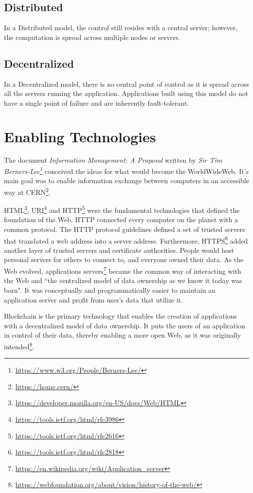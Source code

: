 	\subsection{Distributed}
	In a Distributed model, the control still resides with a central server; however, the computation is spread across multiple nodes or servers.
	
	\subsection{Decentralized}
	In a Decentralized model, there is no central point of control as it is spread across all the servers running the application. Applications built using this model do not have a single point of failure and are inherently fault-tolerant.

\section{Enabling Technologies}
	The document \textit{Information Management: A Proposal\cite{berners1989information}} written by \textit{Sir Tim Berners-Lee\footnote{\url{https://www.w3.org/People/Berners-Lee/}}} conceived the ideas for what would become the WorldWideWeb. It's main goal was to enable information exchange between computers in an accessible way at CERN\footnote{\url{https://home.cern/}}.
	
	HTML\footnote{\url{https://developer.mozilla.org/en-US/docs/Web/HTML}}, URI\footnote{\url{https://tools.ietf.org/html/rfc3986}} and HTTP\footnote{\url{https://tools.ietf.org/html/rfc2616}} were the fundamental technologies that defined the foundation of the Web. HTTP connected every computer on the planet with a common protocol. The HTTP protocol guidelines defined a set of trusted servers that translated a web address into a server address. Furthermore, HTTPS\footnote{\url{https://tools.ietf.org/html/rfc2818}} added another layer of trusted servers and certificate authorities. People would host personal servers for others to connect to, and everyone owned their data\cite{raval2016decentralized}. As the Web evolved, applications servers\footnote{\url{https://en.wikipedia.org/wiki/Application_server}} became the common way of interacting with the Web and ``the centralized model of data ownership as we know it today was born"\cite{raval2016decentralized}. It was conceptually and programmatically easier to maintain an application server and profit from user's data that utilize it.
	
	Blockchain is the primary technology that enables the creation of applications with a decentralized model of data ownership. It puts the users of an application in control of their data, thereby enabling a more open Web, as it was originally intended\footnote{\url{https://webfoundation.org/about/vision/history-of-the-web/}}.
	
